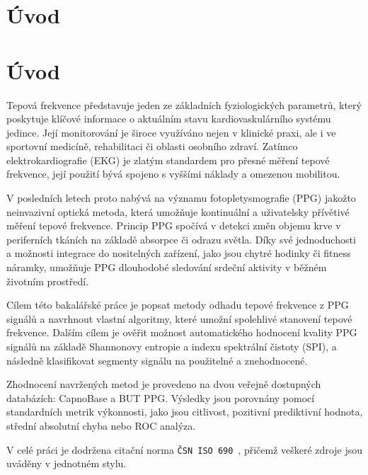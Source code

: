 \chapter*{Úvod}
{}
\label{ch:uvod}
\chapter{Úvod}

Tepová frekvence představuje jeden ze základních fyziologických parametrů, který poskytuje klíčové informace o aktuálním stavu kardiovaskulárního systému jedince.
Její monitorování je široce využíváno nejen v klinické praxi, ale i ve sportovní medicíně, rehabilitaci či oblasti osobního zdraví.
Zatímco elektrokardiografie (\acs{EKG}) je zlatým standardem pro přesné měření tepové frekvence, její použití bývá spojeno s vyššími náklady a omezenou mobilitou.

V posledních letech proto nabývá na významu fotopletysmografie (\acs{PPG}) jakožto neinvazivní optická metoda, která umožňuje kontinuální a uživatelsky přívětivé měření tepové frekvence.
Princip \acs{PPG} spočívá v detekci změn objemu krve v periferních tkáních na základě absorpce či odrazu světla.
Díky své jednoduchosti a možnosti integrace do nositelných zařízení, jako jsou chytré hodinky či fitness náramky, umožňuje \acs{PPG} dlouhodobé sledování srdeční aktivity v běžném životním prostředí.

Cílem této bakalářské práce je popsat metody odhadu tepové frekvence z \acs{PPG} signálů a navrhnout vlastní algoritmy, které umožní spolehlivé stanovení tepové frekvence.
Dalším cílem je ověřit možnost automatického hodnocení kvality \acs{PPG} signálů na základě Shannonovy entropie a indexu spektrální čistoty (\acs{SPI}), a následně klasifikovat segmenty signálu na použitelné a znehodnocené.

Zhodnocení navržených metod je provedeno na dvou veřejně dostupných databázích: CapnoBase a \acs{BUT PPG}.
Výsledky jsou porovnány pomocí standardních metrik výkonnosti, jako jsou citlivost, pozitivní prediktivní hodnota, střední absolutní chyba nebo ROC analýza.

V celé práci je dodržena citační norma \texttt{ČSN ISO 690}~\cite{Vyklad_normy_CSN_ISO_690-2022,CSN_ISO_690-2022}, přičemž veškeré zdroje jsou uváděny v jednotném stylu.

% 
% 
% 
